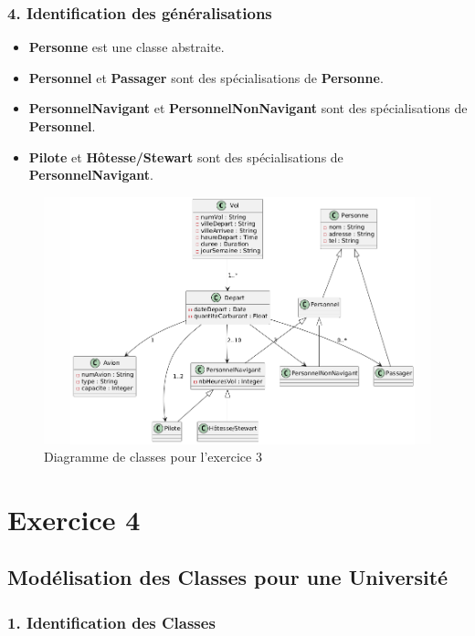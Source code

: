 \documentclass{article}
\begin{document}
\subsubsection*{4. Identification des généralisations}

\begin{itemize}
  \item \textbf{Personne} est une classe abstraite.
  \item \textbf{Personnel} et \textbf{Passager} sont des spécialisations de \textbf{Personne}.
  \item \textbf{PersonnelNavigant} et \textbf{PersonnelNonNavigant} sont des spécialisations de \textbf{Personnel}.
  \item \textbf{Pilote} et \textbf{Hôtesse/Stewart} sont des spécialisations de \textbf{PersonnelNavigant}.
\end{itemize}

\begin{figure}[h]
  \centering
  \includegraphics[width=\textwidth]{exo3.png}
  \caption{Diagramme de classes pour l'exercice 3}
\end{figure}

\section*{Exercice 4}

\subsection*{Modélisation des Classes pour une Université}

\subsubsection*{1. Identification des Classes}
\end{document}
